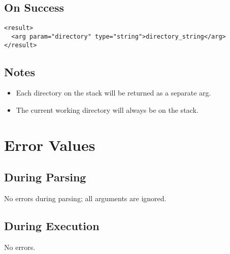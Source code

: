 \documentclass[10pt]{article}
\begin{document}
\subsection*{ On Success }
\begin{verbatim}
<result>
  <arg param="directory" type="string">directory_string</arg>
</result>

\end{verbatim}
\subsection*{ Notes }
\begin{itemize}
\item  Each directory on the stack will be returned as a separate arg. 
\item  The current working directory will always be on the stack. 

\end{itemize}
\section*{ Error Values }
\subsection*{ During Parsing }


 No errors during parsing; all arguments are ignored. 
\subsection*{ During Execution }


 No errors. 
\end{document}
